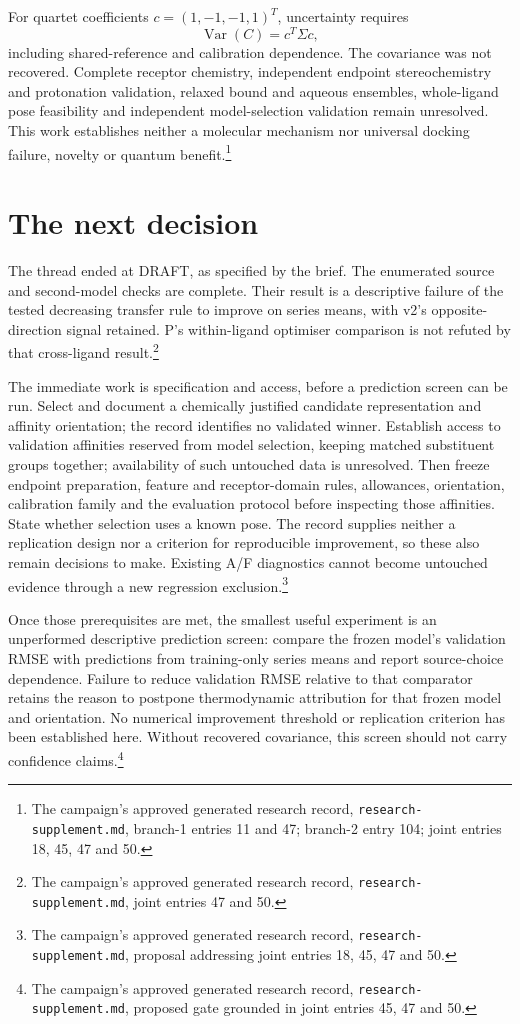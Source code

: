 \documentclass{article}
\newcommand{\rr}[1]{\footnote{The campaign's approved generated research record, \texttt{research-supplement.md}, #1.}}
\begin{document}
For quartet coefficients \(c=(1,-1,-1,1)^T\), uncertainty requires
\[
 \operatorname{Var}(C)=c^T\Sigma c,
\]
including shared-reference and calibration dependence. The covariance was not recovered. Complete receptor chemistry, independent endpoint stereochemistry and protonation validation, relaxed bound and aqueous ensembles, whole-ligand pose feasibility and independent model-selection validation remain unresolved. This work establishes neither a molecular mechanism nor universal docking failure, novelty or quantum benefit.\rr{branch-1 entries 11 and 47; branch-2 entry 104; joint entries 18, 45, 47 and 50}

\section{The next decision}

The thread ended at DRAFT, as specified by the brief. The enumerated source and second-model checks are complete. Their result is a descriptive failure of the tested decreasing transfer rule to improve on series means, with v2's opposite-direction signal retained. P's within-ligand optimiser comparison is not refuted by that cross-ligand result.\rr{joint entries 47 and 50}

The immediate work is specification and access, before a prediction screen can be run. Select and document a chemically justified candidate representation and affinity orientation; the record identifies no validated winner. Establish access to validation affinities reserved from model selection, keeping matched substituent groups together; availability of such untouched data is unresolved. Then freeze endpoint preparation, feature and receptor-domain rules, allowances, orientation, calibration family and the evaluation protocol before inspecting those affinities. State whether selection uses a known pose. The record supplies neither a replication design nor a criterion for reproducible improvement, so these also remain decisions to make. Existing A/F diagnostics cannot become untouched evidence through a new regression exclusion.\rr{proposal addressing joint entries 18, 45, 47 and 50}

Once those prerequisites are met, the smallest useful experiment is an unperformed descriptive prediction screen: compare the frozen model's validation RMSE with predictions from training-only series means and report source-choice dependence. Failure to reduce validation RMSE relative to that comparator retains the reason to postpone thermodynamic attribution for that frozen model and orientation. No numerical improvement threshold or replication criterion has been established here. Without recovered covariance, this screen should not carry confidence claims.\rr{proposed gate grounded in joint entries 45, 47 and 50}
\end{document}
